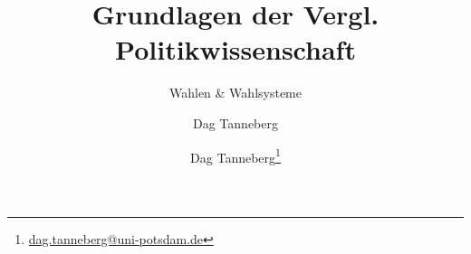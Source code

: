 \usepackage[ngerman]{babel}
\usepackage[utf8]{inputenc}
\usepackage{graphicx}
\usepackage{hyperref}
\usepackage{multirow}
\usepackage{booktabs}
\usepackage{tikz}
  \usetikzlibrary{positioning}
  \usetikzlibrary{calc}
  \usetikzlibrary{matrix}
\usepackage{adjustbox}
\usepackage{tikzscale}
\usepackage{harveyballs}

\author{Dag Tanneberg}
\title{Grundlagen der Vergl. Politikwissenschaft}
\subtitle{Wahlen \& Wahlsysteme}
\author{Dag Tanneberg\thanks{%
  \href{mailto:dag.tanneberg@uni-potsdam.de}%
    {dag.tanneberg@uni-potsdam.de}
  }
}
\hypersetup{colorlinks, urlcolor = red, linkcolor = }

